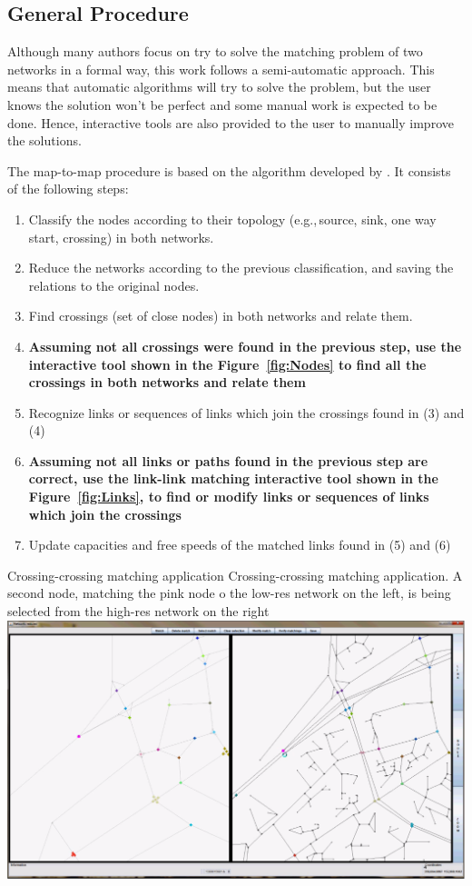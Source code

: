 \subsection{General Procedure}
Although many authors focus on try to solve the matching problem of two networks in a formal way, this work follows a semi-automatic approach. This means that automatic algorithms will try to solve the problem, but the user knows the solution won't be perfect and some manual work is expected to be done. Hence, interactive tools are also provided to the user to manually improve the solutions.

The map-to-map procedure is based on the algorithm developed by \citet{BalmerEtAl_STRC_2005}. It consists of the following steps:
%
\begin{enumerate}
\item Classify the nodes according to their topology (e.g.,\,source, sink, one way start, crossing) in both networks.
\item Reduce the networks according to the previous classification, and saving the relations to the original nodes.
\item Find crossings (set of close nodes) in both networks and relate them.
\item \textbf{Assuming not all crossings were found in the previous step, use the interactive tool shown in the Figure~\ref{fig:Nodes} to find all the crossings in both networks and relate them}
\item Recognize links or sequences of links which join the crossings found in (3) and (4)
\item \textbf{Assuming not all links or paths found in the previous step are correct, use the link-link matching interactive tool shown in the Figure~\ref{fig:Links}, to find or modify links or sequences of links which join the crossings}
\item Update capacities and free speeds of the matched links found in (5) and (6)
\end{enumerate}
%
\createfigure
{Crossing-crossing matching application}
{Crossing-crossing matching application. A second node, matching the pink node o the low-res network on the left, is being selected from the high-res network on the right}
{\label{fig:Nodes}}
{\includegraphics[width=1.0\textwidth]{extending/figures/netEdSing/Nodes.png}}
{}

